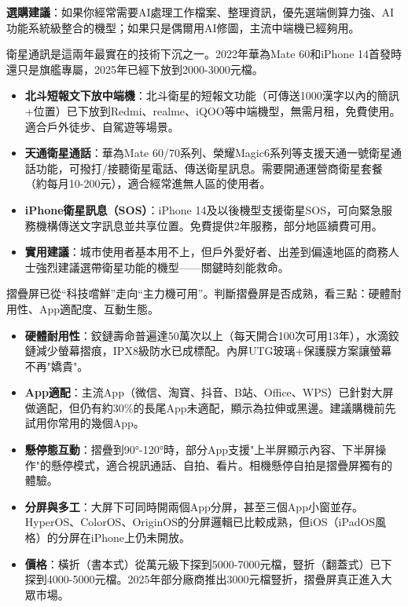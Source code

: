 \textbf{選購建議}：如果你經常需要AI處理工作檔案、整理資訊，優先選端側算力強、AI功能系統級整合的機型；如果只是偶爾用AI修圖，主流中端機已經夠用。


衛星通訊是這兩年最實在的技術下沉之一。2022年華為Mate 60和iPhone 14首發時還只是旗艦專屬，2025年已經下放到2000-3000元檔。

\begin{itemize}
  \item \textbf{北斗短報文下放中端機}：北斗衛星的短報文功能（可傳送1000漢字以內的簡訊+位置）已下放到Redmi、realme、iQOO等中端機型，無需月租，免費使用。適合戶外徒步、自駕遊等場景。
  \item \textbf{天通衛星通話}：華為Mate 60/70系列、榮耀Magic6系列等支援天通一號衛星通話功能，可撥打/接聽衛星電話、傳送衛星訊息。需要開通運營商衛星套餐（約每月10-200元），適合經常進無人區的使用者。
  \item \textbf{iPhone衛星訊息（SOS）}：iPhone 14及以後機型支援衛星SOS，可向緊急服務機構傳送文字訊息並共享位置。免費提供2年服務，部分地區續費可用。
  \item \textbf{實用建議}：城市使用者基本用不上，但戶外愛好者、出差到偏遠地區的商務人士強烈建議選帶衛星功能的機型——關鍵時刻能救命。
\end{itemize}


摺疊屏已從“科技嚐鮮”走向“主力機可用”。判斷摺疊屏是否成熟，看三點：硬體耐用性、App適配度、互動生態。

\begin{itemize}
  \item \textbf{硬體耐用性}：鉸鏈壽命普遍達50萬次以上（每天開合100次可用13年），水滴鉸鏈減少螢幕摺痕，IPX8級防水已成標配。內屏UTG玻璃+保護膜方案讓螢幕不再"嬌貴"。
  \item \textbf{App適配}：主流App（微信、淘寶、抖音、B站、Office、WPS）已針對大屏做適配，但仍有約30\%的長尾App未適配，顯示為拉伸或黑邊。建議購機前先試用你常用的幾個App。
  \item \textbf{懸停態互動}：摺疊到90°-120°時，部分App支援"上半屏顯示內容、下半屏操作"的懸停模式，適合視訊通話、自拍、看片。相機懸停自拍是摺疊屏獨有的體驗。
  \item \textbf{分屏與多工}：大屏下可同時開兩個App分屏，甚至三個App小窗並存。HyperOS、ColorOS、OriginOS的分屏邏輯已比較成熟，但iOS（iPadOS風格）的分屏在iPhone上仍未開放。
  \item \textbf{價格}：橫折（書本式）從萬元級下探到5000-7000元檔，豎折（翻蓋式）已下探到4000-5000元檔。2025年部分廠商推出3000元檔豎折，摺疊屏真正進入大眾市場。
\end{itemize}

